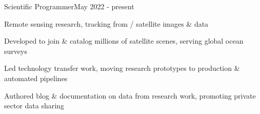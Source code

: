 \documentclass{article}
\newenvironment{**mylist}[2]{
  \subsubsection*{#1\hfill#2}
  \small
  \begin{list}{}{}
    \setlength{\topsep}{0pt}
   \setlength{\itemsep}{1pt}
   \setlength{\parskip}{0pt}
   \setlength{\parsep}{0pt}}{\end{list}\normalsize}
\begin{document}
\begin{**mylist}{\href{https://globalfishingwatch.org/}{} \tabb Scientific Programmer}{May 2022 - present}
\item Remote sensing research, tracking  from / satellite images \&  data
\item Developed \href{https://github.com/GlobalFishingWatch/gfwsat/}{} to join \& catalog millions of satellite scenes, serving global ocean surveys
\item Led technology transfer work, moving research prototypes to production \& automated pipelines
\item Authored blog \& documentation on data from research work, promoting private sector data sharing
\end{**mylist}
\end{document}
